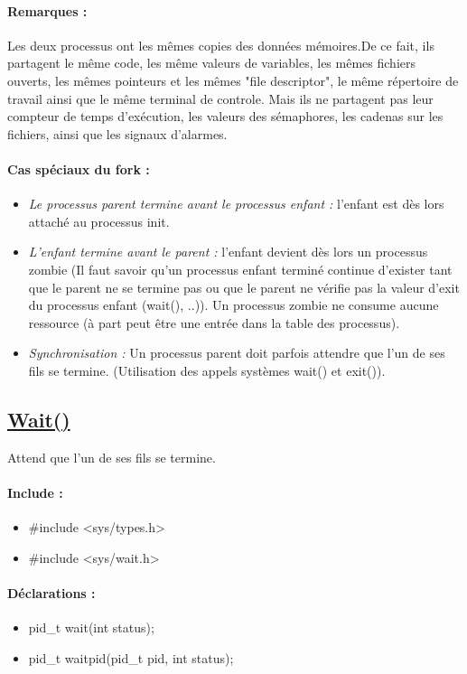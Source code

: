 \documentclass{article}[12pt]
\begin{document}
\paragraph{Remarques : }
Les deux processus ont les mêmes copies des données mémoires.De ce fait, ils partagent le même code, les même valeurs de variables, les mêmes fichiers ouverts, les mêmes pointeurs et les mêmes "file descriptor", le même répertoire de travail ainsi que le même terminal de controle. Mais ils ne partagent pas leur compteur de temps d'exécution, les valeurs des sémaphores, les cadenas sur les fichiers, ainsi que les signaux d'alarmes.
\paragraph{Cas spéciaux du fork : }
\begin{itemize}
\item \emph{Le processus parent termine avant le processus enfant :} l'enfant est dès lors attaché au processus init.
\item \emph{L'enfant termine avant le parent :} l'enfant devient dès lors un processus zombie (Il faut savoir qu'un processus enfant terminé continue d'exister tant que le parent ne se termine pas ou que le parent ne vérifie pas la valeur d'exit du processus enfant (wait(), ..)). Un processus zombie ne consume aucune ressource (à part peut être une entrée dans la table des processus).
\item \emph{Synchronisation :} Un processus parent doit parfois attendre que l'un de ses fils se termine. (Utilisation des appels systèmes wait() et exit()).
\end{itemize}
\subsection{\href{http://jp.barralis.com/linux-man/man2/wait.2.php}{Wait()}}
Attend que l'un de ses fils se termine.
\paragraph{Include : }
\begin{itemize}
	\item \#include <sys/types.h>
    \item \#include <sys/wait.h>
\end{itemize}
\paragraph{Déclarations : }
\begin{itemize}
	\item pid\_t wait(int \* status);
    \item pid\_t waitpid(pid\_t pid, int \* status);
\end{itemize}
\end{document}
